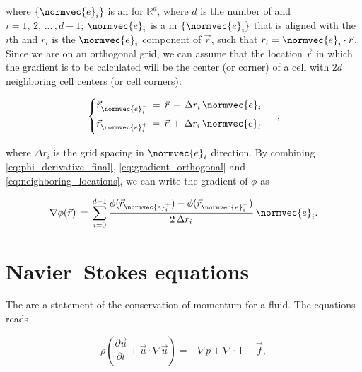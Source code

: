 where $\{\normvec{e}_i\}$ is an  for $\mathbb{R}^d$, where $d$ is the number of \dimensions and $i = 1,\,2,\,...\,,d-1$; $\normvec{e}_i$ is a  in $\{\normvec{e}_i\}$ that is aligned with the $i$th  and $r_i$ is the $\normvec{e}_i$ component of $\vec{r}$,
such that $r_i = \normvec{e}_i\cdot\vec{r}$. Since we are on an orthogonal grid, we can assume that the location $\vec{r}$ in which the gradient is to be calculated will be the center (or corner) of a cell with $2d$ neighboring cell centers (or cell corners):

\begin{equation} \label{eq:neighboring_locations}
\begin{cases}
\vec{r}_{\normvec{e}_i^-} \,=\, \vec{r} \,-\, \Delta r_i\,\normvec{e}_i\\[1ex]
\vec{r}_{\normvec{e}_i^+} \,=\, \vec{r} \,+\, \Delta r_i\,\normvec{e}_i\\[1ex]
\end{cases}\ ,
\end{equation}

where $\Delta r_i$ is the grid spacing in $\normvec{e}_i$ direction. By combining  \ref{eq:phi_derivative_final}, \ref{eq:gradient_orthogonal} and \ref{eq:neighboring_locations}, we can write the gradient of $\phi$ as

\begin{equation} \label{eq:gradient_final}
\nabla\phi(\vec{r}) \,=\,
\sum_{i=0}^{d-1}\frac{\phi(\vec{r}_{\normvec{e}_i^+})-\phi(\vec{r}_{\normvec{e}_i^-})}{2\,\Delta r_i}\,\normvec{e}_i.
\end{equation}

\section{Navier--Stokes equations}

The  are a statement of the conservation of momentum for a fluid. The  equations reads

\begin{equation} \label{eq:navier_stokes}
\rho\left(\frac{\partial\vec{u}}{\partial t} + \vec{u}\cdot\nabla\vec{u}\right) = -\nabla p + \nabla\cdot\boldsymbol{\mathsf{T}} + \vec{f},
\end{equation}


